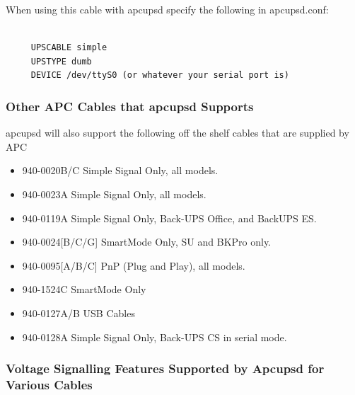 {{{{{{{{{{\begin{verbatim}
\end{verbatim}
\normalsize

When using this cable with apcupsd specify the following in apcupsd.conf: 

\footnotesize
\begin{verbatim}
     
     UPSCABLE simple
     UPSTYPE dumb
     DEVICE /dev/ttyS0 (or whatever your serial port is)
\end{verbatim}
\normalsize

\label{Other-APC-Cables-that-apcupsd-Supports}

\subsubsection*{Other APC Cables that apcupsd Supports}

apcupsd will also support the following off the shelf cables that are supplied
by APC  

\begin{itemize}
\item 940-0020B/C Simple Signal Only, all models.  
\item 940-0023A Simple Signal Only, all models.  
\item 940-0119A Simple Signal Only, Back-UPS Office, and BackUPS ES.  
\item 940-0024[B/C/G] SmartMode Only, SU and BKPro only.  
\item 940-0095[A/B/C] PnP (Plug and Play), all models.  
\item 940-1524C SmartMode Only  
\item 940-0127A/B USB Cables  
\item 940-0128A Simple Signal Only, Back-UPS CS in serial mode. 
\end{itemize}

\label{Voltage-Signalling-Features-Supported-by-Apcupsd-for-Various-Cables}

\subsubsection*{Voltage Signalling Features Supported by Apcupsd for Various
Cables}

}}}}}}}}}}
